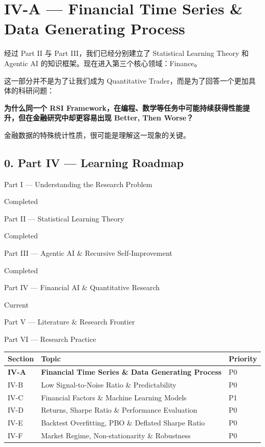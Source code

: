 \hypertarget{part-4-52-0001-iv-a-financial-time-series-data-generating-process}{%
\section{IV-A --- Financial Time Series \& Data Generating Process}\label{part-4-52-0001-iv-a-financial-time-series-data-generating-process}}

经过 Part II 与 Part III，我们已经分别建立了 Statistical Learning Theory 和 Agentic AI 的知识框架。现在进入第三个核心领域：Finance。

这一部分并不是为了让我们成为 Quantitative Trader，而是为了回答一个更加具体的科研问题：

\textbf{为什么同一个 RSI Framework，在编程、数学等任务中可能持续获得性能提升，但在金融研究中却更容易出现 Better, Then Worse？}

金融数据的特殊统计性质，很可能是理解这一现象的关键。

\hypertarget{part-4-52-0001-part-iv-learning-roadmap}{%
\subsection{0. Part IV --- Learning Roadmap}\label{part-4-52-0001-part-iv-learning-roadmap}}

Part I --- Understanding the Research Problem

Completed

Part II --- Statistical Learning Theory

Completed

Part III --- Agentic AI \& Recursive Self-Improvement

Completed

Part IV --- Financial AI \& Quantitative Research

Current

Part V --- Literature \& Research Frontier

Part VI --- Research Practice

\begin{readertable}
\begin{longtable}[]{@{}
  >{\raggedright\arraybackslash}p{}
  >{\raggedright\arraybackslash}p{}
  >{\raggedright\arraybackslash}p{}@{}}
\toprule
Section & Topic & Priority \\
\midrule
\endhead
\textbf{IV-A} & \textbf{Financial Time Series \& Data Generating Process} & P0 \\
IV-B & Low Signal-to-Noise Ratio \& Predictability & P0 \\
IV-C & Financial Factors \& Machine Learning Models & P1 \\
IV-D & Returns, Sharpe Ratio \& Performance Evaluation & P0 \\
IV-E & Backtest Overfitting, PBO \& Deflated Sharpe Ratio & P0 \\
IV-F & Market Regime, Non-stationarity \& Robustness & P0 \\
\bottomrule
\end{longtable}
\end{readertable}

